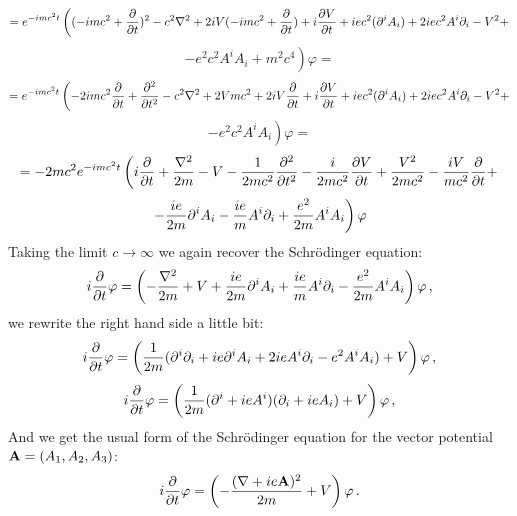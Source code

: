 \begin{equation*}
  =e^{-imc^2t}\left( (-imc^2+{\partial\over\partial t})^2 -c^2\nabla^2 +2iV(-imc^2+{\partial\over\partial t}) +i{\partial V\over\partial t} +iec^2(\partial^i A_i) +2iec^2A^i\partial_i -V^2+ \right.
\end{equation*}
\begin{equation*}
  \left. -e^2c^2A^iA_i +m^2c^4 \right)\varphi=
\end{equation*}
\begin{equation*}
  =e^{-imc^2t}\left( -2imc^2{\partial\over\partial t}+{\partial^2\over\partial t^2} -c^2\nabla^2 +2Vmc^2 +2iV{\partial\over\partial t} +i{\partial V\over\partial t} +iec^2(\partial^i A_i) +2iec^2A^i\partial_i -V^2+ \right.
\end{equation*}
\begin{equation*}
  \left. -e^2c^2A^iA_i \right)\varphi=
\end{equation*}
\begin{equation*}
  = -2mc^2 e^{-imc^2 t} \left(i{\partial\over\partial t}+{\nabla^2\over2m}-V -{1\over2mc^2}{\partial^2\over\partial t^2}-{i\over2mc^2}{\partial V\over\partial t}+{V^2\over2mc^2}-{iV\over mc^2}{\partial\over\partial t}+\right.
\end{equation*}
\begin{equation*}
  \left.-{ie\over2m}\partial^i A_i-{ie\over m}A^i\partial_i+{e^2\over2m}A^iA_i\right)\varphi
\end{equation*}
Taking the limit $c\to\infty$ we again recover the Schrödinger equation: 
\begin{equation*}
  i{\partial\over\partial t}\varphi=\left(-{\nabla^2\over2 m}+V +{ie\over2m}\partial^i A_i +{ie\over m}A^i\partial_i -{e^2\over2m}A^iA_i \right)\varphi\,,
\end{equation*}
we rewrite the right hand side a little bit: 
\begin{equation*}
  i{\partial\over\partial t}\varphi=\left({1\over2 m} (\partial^i\partial_i +ie\partial^i A_i +2ieA^i\partial_i -e^2A^iA_i ) +V \right)\varphi\,,
\end{equation*}
\begin{equation*}
  i{\partial\over\partial t}\varphi=\left({1\over2 m} (\partial^i+ieA^i)(\partial_i+ieA_i) +V \right)\varphi\,,
\end{equation*}
And we get the usual form of the Schrödinger equation for the vector potential ${\bf A}=(A_1, A_2, A_3)$: 
\begin{equation*}
  i{\partial\over\partial t}\varphi=\left(-{(\nabla+ie{\bf A})^2\over2 m} +V \right)\varphi\,.
\end{equation*}

